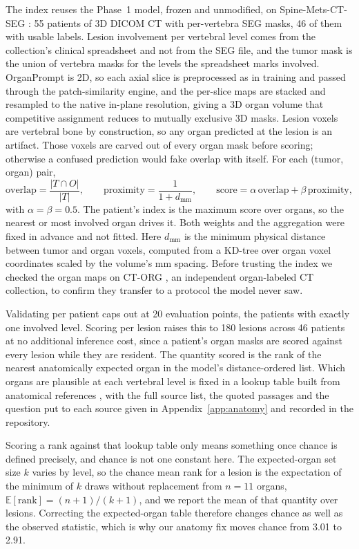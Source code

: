 \documentclass[10pt]{article}
\begin{document}
The index reuses the Phase~1 model, frozen and unmodified, on Spine-Mets-CT-SEG
\cite{pieper2024spinemets}: 55 patients of 3D DICOM CT with per-vertebra SEG
masks, 46 of them with usable labels. Lesion involvement per vertebral level comes
from the collection's clinical spreadsheet and not from the SEG file, and the
tumor mask is the union of vertebra masks for the levels the spreadsheet marks
involved. OrganPrompt is 2D, so each axial slice is preprocessed as in training
and passed through the patch-similarity engine, and the per-slice maps are stacked
and resampled to the native in-plane resolution, giving a 3D organ volume that
competitive assignment reduces to mutually exclusive 3D masks.
Lesion voxels are vertebral bone by construction, so any organ predicted at the
lesion is an artifact. Those voxels are carved out of every organ mask before
scoring; otherwise a confused prediction would fake overlap with itself. For each
(tumor, organ) pair,
\begin{equation}
\text{overlap} = \frac{|T \cap O|}{|T|},
\qquad
\text{proximity} = \frac{1}{1 + d_{\text{mm}}},
\qquad
\text{score} = \alpha\,\text{overlap} + \beta\,\text{proximity},
\end{equation}
with $\alpha=\beta=0.5$. The patient's index is the maximum score over organs, so
the nearest or most involved organ drives it. Both weights and the aggregation
were fixed in advance and not fitted. Here $d_{\text{mm}}$ is the minimum physical
distance between tumor and organ voxels, computed from a KD-tree over organ voxel
coordinates scaled by the volume's mm spacing. Before trusting the index we
checked the organ maps on CT-ORG \cite{rister2020ctorg}, an independent
organ-labeled CT collection, to confirm they transfer to a protocol the model
never saw.

Validating per patient caps out at 20 evaluation points, the patients with exactly
one involved level. Scoring per lesion raises this to 180 lesions across 46
patients at no additional inference cost, since a patient's organ masks are scored
against every lesion while they are resident. The quantity scored is the rank of
the nearest anatomically expected organ in the model's distance-ordered list.
Which organs are plausible at each vertebral level is fixed in a lookup table
built from anatomical references \cite{oh2009retrodiaphragmatic}, with the full
source list, the quoted passages and the question put to each source given in
Appendix~\ref{app:anatomy} and recorded in the repository.

Scoring a rank against that lookup table only means something once chance is
defined precisely, and chance is not one constant here. The expected-organ set size $k$ varies by level,
so the chance mean rank for a lesion is the expectation of the minimum of $k$ draws
without replacement from $n=11$ organs, $\mathbb{E}[\text{rank}] = (n+1)/(k+1)$,
and we report the mean of that quantity over lesions. Correcting the
expected-organ table therefore changes chance as well as the observed statistic,
which is why our anatomy fix moves chance from 3.01 to 2.91.
\end{document}
